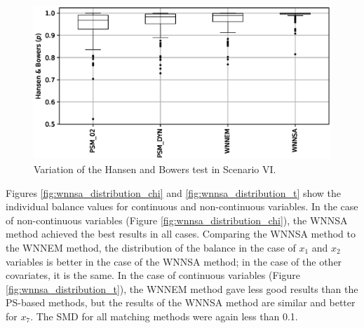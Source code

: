		\begin{figure}[h]
			\centering
                \captionsetup{justification=centering}
			\includegraphics[width=\textwidth]{assets/figures/control_group_selection/wnnsa/scenVI/hbp.eps}
			\caption{Variation of the Hansen and Bowers test in Scenario VI. %
			}
			\label{fig:wnnsa_scen_VI_hbp}    
		\end{figure}
								
		Figures \ref{fig:wnnsa_distribution_chi} and \ref{fig:wnnsa_distribution_t} show the individual balance values for continuous and non-continuous variables. In the case of non-continuous variables (Figure \ref{fig:wnnsa_distribution_chi}), the WNNSA method achieved the best results in all cases. Comparing the WNNSA method to the WNNEM method, the distribution of the balance in the case of $x_1$ and $x_2$ variables is better in the case of the WNNSA method; in the case of the other covariates, it is the same. In the case of continuous variables (Figure \ref{fig:wnnsa_distribution_t}), the WNNEM method gave less good results than the PS-based methods, but the results of the WNNSA method are similar and better for $x_7$. The SMD for all matching methods were again less than 0.1.
								
